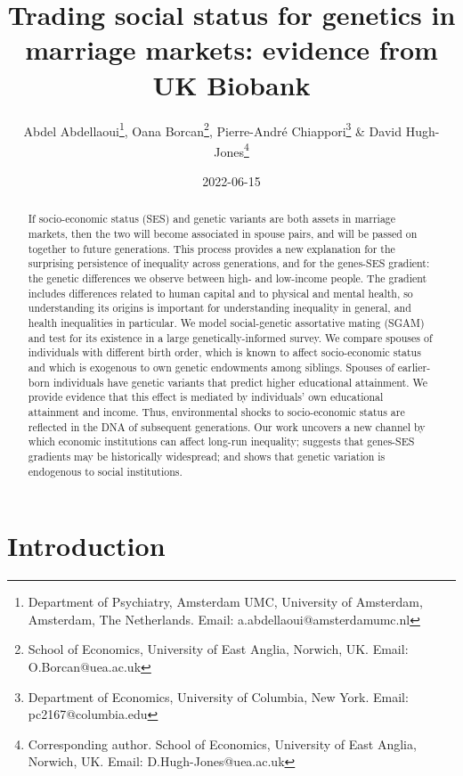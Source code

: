 \documentclass[
]{article}
\title{Trading social status for genetics in marriage markets: evidence from UK Biobank}
\author{Abdel Abdellaoui\thanks{Department of Psychiatry, Amsterdam UMC, University 
of Amsterdam, Amsterdam, The Netherlands. Email: a.abdellaoui@amsterdamumc.nl},
Oana Borcan\thanks{School of Economics, University of East Anglia, Norwich, 
UK. Email: O.Borcan@uea.ac.uk},
Pierre-André Chiappori\thanks{Department of Economics, University of Columbia, 
  New York. Email: pc2167@columbia.edu} \&
David Hugh-Jones\thanks{Corresponding author. School of Economics, 
University of East Anglia, Norwich, UK. Email: D.Hugh-Jones@uea.ac.uk}}
\date{2022-06-15}
\theoremstyle{definition}
\theoremstyle{definition}
\theoremstyle{definition}
\theoremstyle{definition}
\theoremstyle{remark}
\begin{document}
\maketitle
\begin{abstract}
If socio-economic status (SES) and genetic variants are both assets in marriage
markets, then the two will become associated in spouse pairs, and will be
passed on together to future generations. This process provides a new
explanation for the surprising persistence of inequality across generations,
and for the genes-SES gradient: the genetic differences we observe between
high- and low-income people. The gradient includes differences related
to human capital and to physical and mental health, so understanding its origins
is important for understanding inequality in general, and health inequalities
in particular. We model social-genetic assortative mating
(SGAM) and test for its existence in a large genetically-informed survey. We
compare spouses of individuals with different birth order, which is known to
affect socio-economic status and which is exogenous to own genetic endowments
among siblings. Spouses of earlier-born individuals have genetic variants that
predict higher educational attainment. We provide evidence that this effect is
mediated by individuals' own educational attainment and income. Thus,
environmental shocks to socio-economic status are reflected in the DNA of
subsequent generations. Our work uncovers a new channel by which economic
institutions can affect long-run inequality; suggests that genes-SES
gradients may be historically widespread; and shows that genetic variation
is endogenous to social institutions.
\end{abstract}

\normalem

\hypertarget{introduction}{%
\section{Introduction}\label{introduction}}
\end{document}
